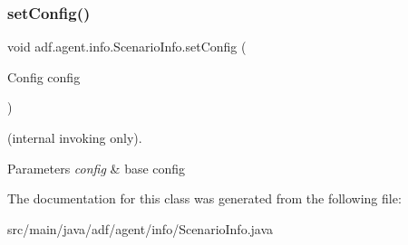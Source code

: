 \subsubsection{\texorpdfstring{set\+Config()}{setConfig()}}
{\footnotesize\ttfamily void adf.\+agent.\+info.\+Scenario\+Info.\+set\+Config (\begin{DoxyParamCaption}\item[{Config}]{config }\end{DoxyParamCaption})}



(internal invoking only). 


\begin{DoxyParams}{Parameters}
{\em config} & base config \\
\hline
\end{DoxyParams}


The documentation for this class was generated from the following file\+:\begin{DoxyCompactItemize}
\item 
src/main/java/adf/agent/info/Scenario\+Info.\+java\end{DoxyCompactItemize}
